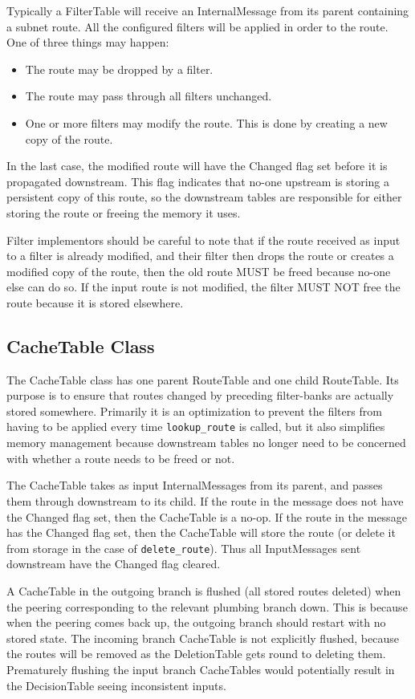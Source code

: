 \documentclass[11pt]{article}
\begin{document}
Typically a FilterTable will receive an InternalMessage from its
parent containing a subnet route.  All the configured filters will be
applied in order to the route.  One of three things may happen:
\begin{itemize}
\item The route may be dropped by a filter.
\item The route may pass through all filters unchanged.
\item One or more filters may modify the route.  This is done by
creating a new copy of the route.
\end{itemize}
In the last case, the modified route will have the Changed flag set
before it is propagated downstream.  This flag indicates that no-one
upstream is storing a persistent copy of this route, so the downstream
tables are responsible for either storing the route or freeing the
memory it uses.

Filter implementors should be careful to note that if the route
received as input to a filter is already modified, and their filter
then drops the route or creates a modified copy of the route, then the
old route MUST be freed because no-one else can do so.  If the input
route is not modified, the filter MUST NOT free the route because it
is stored elsewhere.

\subsection{CacheTable Class}

The CacheTable class has one parent RouteTable and one child
RouteTable.  Its purpose is to ensure that routes changed by preceding
filter-banks are actually stored somewhere.  Primarily it is an
optimization to prevent the filters from having to be applied every
time {\tt lookup\_route} is called, but it also simplifies memory management
because downstream tables no longer need to be concerned with whether
a route needs to be freed or not. 

The CacheTable takes as input InternalMessages from its parent, and
passes them through downstream to its child.  If the route in the
message does not have the Changed flag set, then the CacheTable is a
no-op.  If the route in the message has the Changed flag set, then the
CacheTable will store the route (or delete it from storage in the case
of {\tt delete\_route}).  Thus all InputMessages sent downstream have the
Changed flag cleared.

A CacheTable in the outgoing branch is flushed (all stored routes
deleted) when the peering corresponding to the relevant plumbing
branch down.  This is because when the peering comes back up, the
outgoing branch should restart with no stored state.  The incoming
branch CacheTable is not explicitly flushed, because the routes will
be removed as the DeletionTable gets round to deleting them.
Prematurely flushing the input branch CacheTables would potentially
result in the DecisionTable seeing inconsistent inputs.
\end{document}
